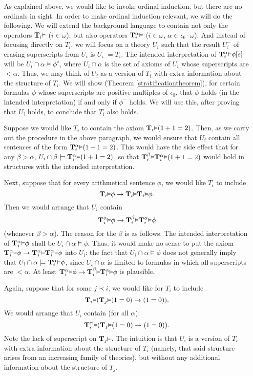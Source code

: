 \documentclass[reqno]{article}
\theoremstyle{definition}
\def\T{\mathbf{T}}
\def\epom{\epsilon_0\cdot\omega}
\renewcommand{\Pr}[1]{\T_{#1}\mbox{\small${\vDash}$}}
\newcommand{\Prr}[2]{\T^{#1}_{#2}\mbox{\small${\vDash}$}}
\begin{document}
As explained above, we would like to invoke ordinal induction, but there
are no ordinals in sight.
In order to make ordinal
induction relevant, we will do the following.
We will extend the background language to contain not only
the operators $\Pr i$ ($i\in\omega$), but also operators $\Prr \alpha i$
($i\in\omega$, $\alpha\in\epom$). And instead of focusing directly on $T_i$,
we will focus
on a theory $U_i$ such that the result $U^-_i$ of erasing superscripts from
$U_i$ is $U^-_i=T_i$.
The intended interpretation
of $\Prr \alpha i \phi[s]$ will be
$U_i\cap\alpha\models\phi^s$,
where $U_i\cap\alpha$ is the set of axioms of $U_i$ whose superscripts are
$<\alpha$.
Thus, we may think of $U_i$ as a version of $T_i$ with extra information about
the structure of $T_i$.
We will show (Theorem \ref{stratificationtheorem}), for certain
formulas $\phi$ whose superscripts are positive multiples of $\epsilon_0$,
that $\phi$ holds (in the intended interpretation) if and only if
$\phi^-$ holds.
We will use this, after proving that $U_i$ holds, to conclude that
$T_i$ also holds.

Suppose we would like $T_i$ to contain the axiom $\Pr i(1+1=2)$.
Then, as we carry out the procedure in the above paragraph, we would ensure that
$U_i$ contain all sentences of the form $\Prr \alpha i (1+1=2)$.
This would have the side effect that for any $\beta>\alpha$,
$U_i\cap\beta\models\Prr \alpha i (1+1=2)$,
so that $\Prr {\beta} i \Prr \alpha i (1+1=2)$
would hold in structures with the intended interpretation.

Next, suppose that for every arithmetical sentence $\phi$,
we would like $T_i$ to include
\[\Pr i\phi\rightarrow \Pr i\Pr i\phi.\]
Then we would arrange that
$U_i$ contain
\[\Prr {\alpha} i\phi \rightarrow \Prr {\beta} i \Prr {\alpha} i \phi\]
(whenever $\beta>\alpha$).
The reason for the $\beta$ is as follows.
The intended interpretation of $\Prr {\alpha} i \phi$ shall be
$U_i\cap\alpha\models \phi$. Thus, it would make no sense to put
the axiom
$\Prr {\alpha} i\phi \rightarrow \Prr {\alpha} i \Prr {\alpha} i \phi$
into $U_i$: the fact that $U_i\cap\alpha\models \phi$
does not generally imply that
$U_i\cap\alpha\models\Prr \alpha i\phi$,
since $U_i\cap\alpha$ is limited to formulas in which all superscripts
are $<\alpha$.
At least
$\Prr {\alpha} i\phi \rightarrow \Prr {\beta} i \Prr {\alpha} i \phi$
is plausible.

Again, suppose that for some $j\prec i$, we would like for $T_i$ to include
\[
\Pr i(\Pr j (1=0)\rightarrow (1=0)).
\]
We would arrange
that $U_i$ contain (for all $\alpha$):
\[
\Prr {\alpha} i(\Pr j (1=0)\rightarrow (1=0)).
\]
Note the lack of superscript on $\Pr j$.
The intuition is that $U_i$ is a
version of $T_i$ with extra information about the structure of
$T_i$ (namely, that said structure arises from an
increasing family of theories), but without any additional information
about the structure of $T_j$.
\end{document}
